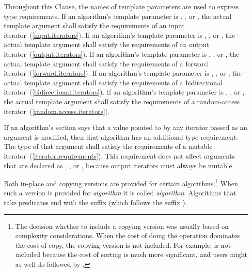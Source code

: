 \begin{removedblock}
\pnum
Throughout this Clause, the names of template parameters
are used to express type requirements.
If an algorithm's template parameter is
,
,
or
,
the actual template argument shall satisfy the
requirements of an input iterator~(\ref{input.iterators}).
If an algorithm's template parameter is
,
,
or
,
the actual template argument shall satisfy the requirements
of an output iterator~(\ref{output.iterators}).
If an algorithm's template parameter is
,
,
or
,
the actual template argument shall satisfy the requirements
of a forward iterator~(\ref{forward.iterators}).
If an algorithm's template parameter is
,
,
or
,
the actual template argument shall satisfy the requirements
of a bidirectional iterator~(\ref{bidirectional.iterators}).
If an algorithm's template parameter is
,
,
or
,
the actual template argument shall satisfy the requirements
of a random-access iterator~(\ref{random.access.iterators}).

\pnum
If an algorithm's
section says that a value pointed to by any iterator passed
as an argument is modified, then that algorithm has an additional
type requirement:
The type of that argument shall satisfy the requirements
of a mutable iterator~(\ref{iterator.requirements}).
\enternote
This requirement does not affect arguments that are declared as
,
,
or
,
because output iterators must always be mutable.
\exitnote
\end{removedblock}

\pnum
Both in-place and copying versions are provided for certain
algorithms.\footnote{The decision whether to include a copying version was
usually based on complexity considerations. When the cost of doing the operation
dominates the cost of copy, the copying version is not included. For example,
 is not included because the cost of sorting is much more
significant, and users might as well do  followed by .}
When such a version is provided for \textit{algorithm} it is called
\textit{algorithm}. Algorithms that take predicates end with the
suffix  (which follows the suffix ).

